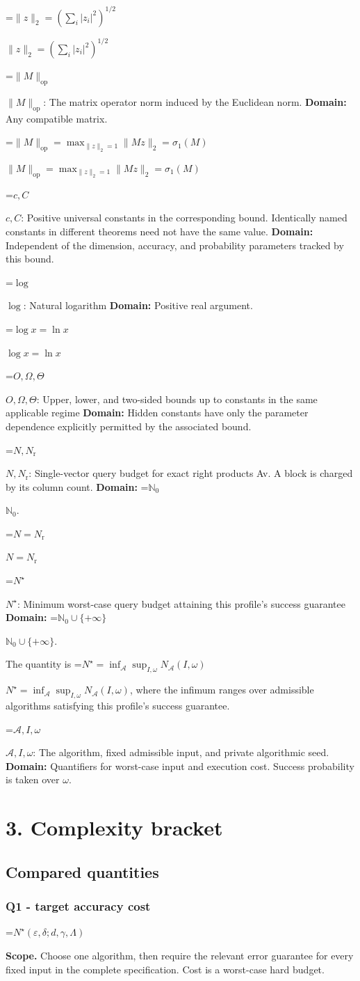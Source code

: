 \documentclass[10pt,a4paper]{article}
\newcommand{\AtlasMath}[1]{\par\begingroup\centering\setbox0=\hbox{$\displaystyle #1$}\ifdim\wd0>1.4\linewidth\typeout{ATLAS WIDE FORMULA: \the\wd0}\fi\ifdim\wd0>\linewidth\resizebox{\linewidth}{!}{\box0}\else\box0\fi\par\endgroup}
\newcommand{\AtlasInlineMath}[1]{\begingroup\setbox0=\hbox{$#1$}\ifdim\wd0>.4\linewidth\endgroup\AtlasMath{#1}\else\endgroup$#1$\fi}
\begin{document}
\AtlasInlineMath{\|z\|_2=(\sum_i|z_i|^2)^{1/2}}

\AtlasInlineMath{\|M\|_{\mathrm{op}}}: The matrix operator norm induced by the Euclidean norm. \textbf{Domain:} Any compatible matrix.

\AtlasInlineMath{\|M\|_{\mathrm{op}}=\max_{\|z\|_2=1}\|Mz\|_2=\sigma_1(M)}

\AtlasInlineMath{c,C}: Positive universal constants in the corresponding bound. Identically named constants in different theorems need not have the same value. \textbf{Domain:} Independent of the dimension, accuracy, and probability parameters tracked by this bound.

\AtlasInlineMath{\log}: Natural logarithm \textbf{Domain:} Positive real argument.

\AtlasInlineMath{\log x=\ln x}

\AtlasInlineMath{O,\Omega,\Theta}: Upper, lower, and two-sided bounds up to constants in the same applicable regime \textbf{Domain:} Hidden constants have only the parameter dependence explicitly permitted by the associated bound.

\AtlasInlineMath{N,N_{\mathrm r}}: Single-vector query budget for exact right products Av. A block is charged by its column count. \textbf{Domain:} \AtlasInlineMath{\mathbb N_0}.

\AtlasInlineMath{N=N_{\mathrm r}}

\AtlasInlineMath{N^\star}: Minimum worst-case query budget attaining this profile's success guarantee \textbf{Domain:} \AtlasInlineMath{\mathbb N_0\cup\{+\infty\}}.

The quantity is \AtlasInlineMath{N^\star=\inf_{\mathcal A}\sup_{I,\omega}N_{\mathcal A}(I,\omega)}, where the infimum ranges over admissible algorithms satisfying this profile's success guarantee.

\AtlasInlineMath{\mathcal A,I,\omega}: The algorithm, fixed admissible input, and private algorithmic seed. \textbf{Domain:} Quantifiers for worst-case input and execution cost. Success probability is taken over $\omega$.

\section{3. Complexity bracket}
\subsection{Compared quantities}
\subsubsection{Q1 - target accuracy cost}
\AtlasMath{N^\star(\varepsilon,\delta;d,\gamma,\Lambda)}
\textbf{Scope.} Choose one algorithm, then require the relevant error guarantee for every fixed input in the complete specification. Cost is a worst-case hard budget.
\end{document}
